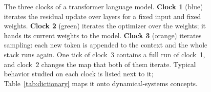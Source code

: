 \begin{figure}[t]
\caption{The three clocks of a transformer language model. \textbf{Clock 1} (blue) iterates the residual update over layers for a fixed input and fixed weights. \textbf{Clock 2} (green) iterates the optimizer over the weights; it hands its current weights to the model. \textbf{Clock 3} (orange) iterates sampling: each new token is appended to the context and the whole stack runs again. One tick of clock~3 contains a full run of clock~1, and clock~2 changes the map that both of them iterate. Typical behavior studied on each clock is listed next to it; Table~\ref{tab:dictionary} maps it onto dynamical-systems concepts.}
\label{fig:clocks}
\end{figure}
